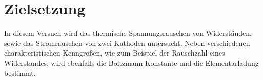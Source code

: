 \section{Zielsetzung}
\label{sec:zielsetzung}

In diesem Versuch wird das thermische Spannungsrauschen von Widerständen, sowie
das Stromrauschen von zwei Kathoden untersucht. Neben verschiedenen
charakteristischen Kenngrößen, wie zum Beispiel der Rauschzahl eines
Widerstandes, wird ebenfalls die Boltzmann-Konstante und die Elementarladung
bestimmt.
